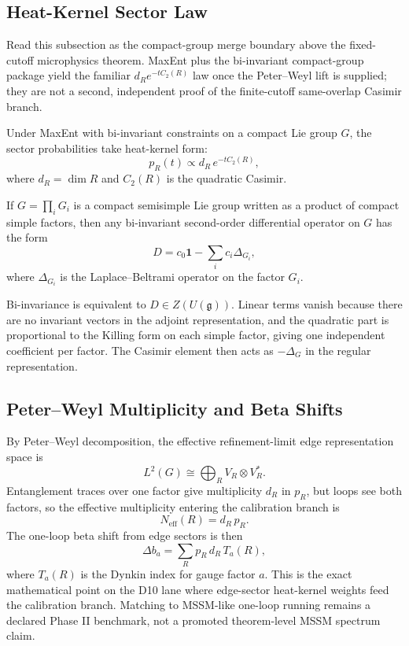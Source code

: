 \subsection{Heat-Kernel Sector Law}

Read this subsection as the compact-group merge boundary above the fixed-cutoff microphysics
theorem. MaxEnt plus the bi-invariant compact-group package yield the familiar
\(d_R e^{-tC_2(R)}\) law once the Peter--Weyl lift is supplied; they are not a second,
independent proof of the finite-cutoff same-overlap Casimir branch.

\begin{theorem}
Under MaxEnt with bi-invariant constraints on a compact Lie group \(G\), the sector probabilities
take heat-kernel form:
\[
p_R(t)\propto d_R\,e^{-tC_2(R)},
\]
where \(d_R=\dim R\) and \(C_2(R)\) is the quadratic Casimir.
\end{theorem}

\begin{lemma}
If \(G=\prod_i G_i\) is a compact semisimple Lie group written as a product of compact simple
factors, then any bi-invariant second-order differential operator on \(G\) has the form
\[
D=c_0\mathbf 1-\sum_i c_i\Delta_{G_i},
\]
where \(\Delta_{G_i}\) is the Laplace--Beltrami operator on the factor \(G_i\).
\end{lemma}

\begin{remark}
Bi-invariance is equivalent to \(D\in Z(U(\mathfrak g))\). Linear terms vanish because there are
no invariant vectors in the adjoint representation, and the quadratic part is proportional to the
Killing form on each simple factor, giving one independent coefficient per factor. The Casimir
element then acts as \(-\Delta_G\) in the regular representation.
\end{remark}

\subsection{Peter--Weyl Multiplicity and Beta Shifts}

By Peter--Weyl decomposition, the effective refinement-limit edge representation space is
\[
L^2(G)\cong \bigoplus_R V_R\otimes V_R^*.
\]
Entanglement traces over one factor give multiplicity \(d_R\) in \(p_R\), but loops see both
factors, so the effective multiplicity entering the calibration branch is
\[
N_{\mathrm{eff}}(R)=d_R\,p_R.
\]
The one-loop beta shift from edge sectors is then
\[
\Delta b_a=\sum_R p_R\,d_R\,T_a(R),
\]
where \(T_a(R)\) is the Dynkin index for gauge factor \(a\). This is the exact mathematical point
on the D10 lane where edge-sector heat-kernel weights feed the calibration branch. Matching to
MSSM-like one-loop running remains a declared Phase II benchmark, not a promoted theorem-level
MSSM spectrum claim.

